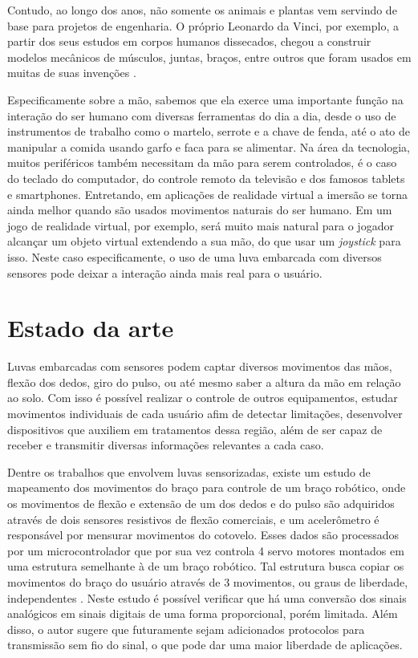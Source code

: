 \documentclass[
	12pt,				%
	openright,			%
	oneside,			%
	a4paper,			%
	english,			%
	brazil				%
	]{abntex2}
\begin{document}
		Contudo, ao longo dos anos, não somente os animais e plantas vem servindo de base para projetos de engenharia. O próprio Leonardo da Vinci, por exemplo, a partir dos seus estudos em corpos humanos dissecados, chegou a construir modelos mecânicos de músculos, juntas, braços, entre outros que foram usados em muitas de suas invenções \cite{rosheim2006leonardo}.
		
		Especificamente sobre a mão, sabemos que ela exerce uma importante função na interação do ser humano com diversas ferramentas do dia a dia, desde o uso de instrumentos de trabalho como o martelo, serrote e a chave de fenda, até o ato de manipular a comida usando garfo e faca para se alimentar. Na área da tecnologia, muitos periféricos também necessitam da mão para serem controlados, é o caso do teclado do computador, do controle remoto da televisão e dos famosos tablets e smartphones.	Entretando, em aplicações de realidade virtual a imersão se torna ainda melhor quando são usados movimentos naturais do ser humano. Em um jogo de realidade virtual, por exemplo, será muito mais natural para o jogador alcançar um objeto virtual extendendo a sua mão, do que usar um \textit{joystick} para isso. Neste caso especificamente, o uso de uma luva embarcada com diversos sensores pode deixar a interação ainda mais real para o usuário. 
	

		\section{Estado da arte}

		
		Luvas embarcadas com sensores podem captar diversos movimentos das mãos, flexão dos dedos, giro do pulso, ou até mesmo saber a altura da mão em relação ao solo. Com isso é possível realizar o controle de outros equipamentos, estudar movimentos individuais de cada usuário afim de detectar limitações, desenvolver dispositivos que auxiliem em tratamentos dessa região, além de ser capaz de receber e transmitir diversas informações relevantes a cada caso.

		Dentre os trabalhos que envolvem luvas sensorizadas, existe um estudo de mapeamento dos movimentos do braço para controle de um braço robótico, onde os movimentos de flexão e extensão de um dos dedos e do pulso são adquiridos através de dois sensores resistivos de flexão comerciais, e um acelerômetro é responsável por mensurar movimentos do cotovelo. Esses dados são processados por um microcontrolador que por sua vez controla 4 servo motores montados em uma estrutura semelhante à de um braço robótico. Tal estrutura busca copiar os movimentos do braço do usuário através de 3 movimentos, ou graus de liberdade, independentes \cite{syed2012armcontroller}. Neste estudo é possível verificar que há uma conversão dos sinais analógicos em sinais digitais de uma forma proporcional, porém limitada. Além disso, o autor sugere que futuramente sejam adicionados protocolos para transmissão sem fio do sinal, o que pode dar uma maior liberdade de aplicações.
		
\end{document}
